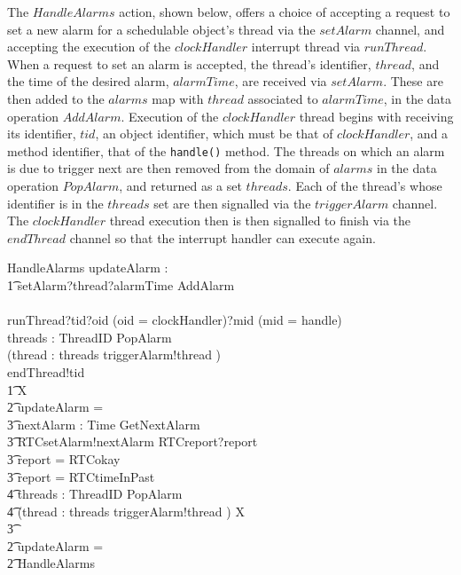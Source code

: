 The $HandleAlarms$ action, shown below, offers a choice of accepting a
request to set a new alarm for a schedulable object's thread via the
$setAlarm$ channel, and accepting the execution of the $clockHandler$
interrupt thread via $runThread$.
When a request to set an alarm is accepted, the thread's identifier,
$thread$, and the time of the desired alarm, $alarmTime$, are received
via $setAlarm$.
These are then added to the $alarms$ map with $thread$ associated to
$alarmTime$, in the data operation $AddAlarm$.
Execution of the $clockHandler$ thread begins with receiving its
identifier, $tid$, an object identifier, which must be that of
$clockHandler$, and a method identifier, that of the \texttt{handle()}
method.
The threads on which an alarm is due to trigger next are then removed
from the domain of $alarms$ in the data operation $PopAlarm$, and
returned as a set $threads$.
Each of the thread's whose identifier is in the $threads$ set are then
signalled via the $triggerAlarm$ channel.
The $clockHandler$ thread execution then is then signalled to finish
via the $endThread$ channel so that the interrupt handler can execute
again.
\begin{circusaction}
  HandleAlarms \circdef \circvar updateAlarm : \boolean \circspot \\
  \t1 \circblockbegin
  \circblockbegin setAlarm?thread?alarmTime \then \lschexpract AddAlarm \rschexpract \circblockend \\
  {} \extchoice {} \\
  \circblockbegin
  runThread?tid?oid \prefixcolon (oid = clockHandler)?mid \prefixcolon (mid = handle) \\
  {} \then \circvar threads : \finset ThreadID \circspot \lschexpract PopAlarm \rschexpract \circseq \\
  (\Semi thread : threads \circspot triggerAlarm!thread \then \Skip) \circseq \\
  endThread!tid \then \Skip
  \circblockend
  \circblockend \circseq \\
  \t1 \circmu X \circspot \\
  \t2 \circif updateAlarm = \true \circthen {} \\
  \t3 \circvar nextAlarm : Time \circspot \lschexpract GetNextAlarm \rschexpract \circseq \\
  \t3 RTCsetAlarm!nextAlarm \then RTCreport?report \then {} \\
  \t3 \circif report = RTCokay \circthen \Skip \\
  \t3 {} \circelse report = RTCtimeInPast \circthen {} \\
  \t4 \circvar threads : \finset ThreadID \circspot \lschexpract PopAlarm \rschexpract \circseq \\
  \t4 (\Semi thread : threads \circspot triggerAlarm!thread \then \Skip) \circseq X \\
  \t3 \circfi \\
  \t2 {} \circelse updateAlarm = \false \circthen \Skip \\
  \t2 \circfi \circseq HandleAlarms
\end{circusaction}
